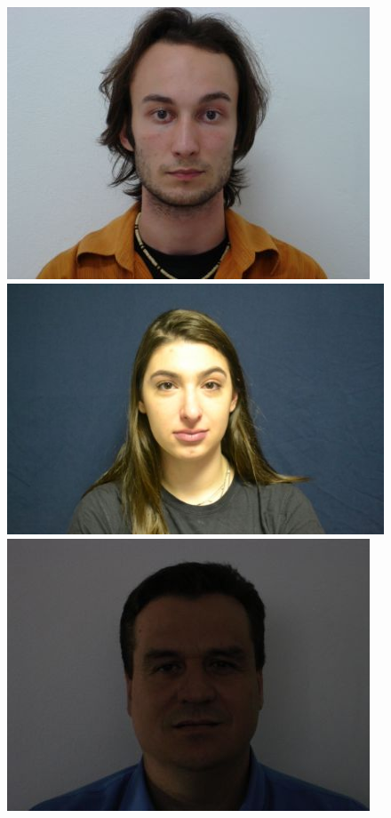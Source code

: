 \begin{figure}[H]
 \centering 
    \subfloat
        {\hspace{1cm}\includegraphics[scale = 0.1]{figures/042.jpg}\hspace{1.3cm}}
    \subfloat
        {\includegraphics[scale = 0.1]{figures/132.jpg}\hspace{0.3cm}}
    \subfloat
        {\includegraphics[scale = 0.1]{figures/145.jpg}\hspace{1.1cm}}

\end{figure}
